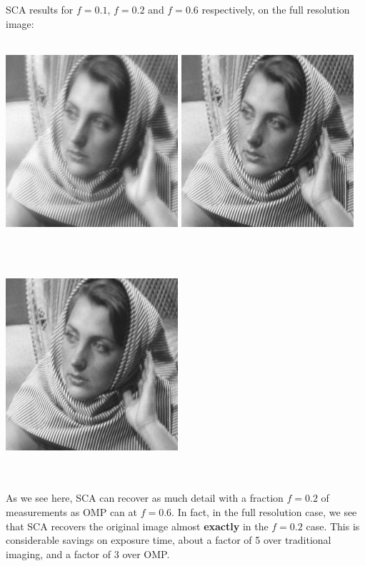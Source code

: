 \documentclass[letterpaper, 10 pt, conference]{article}
\begin{document}
\noindent SCA results for $f=0.1$, $f=0.2$ and $f=0.6$ respectively, on the full resolution image: \\ \\
\centerline{\includegraphics[scale=0.5]{out-sca4x-10p} \includegraphics[scale=0.5]{out-sca4x-20p}} \\ \\
\centerline{ \includegraphics[scale=0.5]{out-sca4x-60p}} \\ \\

\noindent As we see here, SCA can recover as much detail with a fraction $f=0.2$ of measurements as OMP can at $f=0.6$. In fact, in the full resolution case, we see that SCA recovers the original image almost \textbf{exactly} in the $f=0.2$ case. This is considerable savings on exposure time, about a factor of 5 over traditional imaging, and a factor of 3 over OMP.
\end{document}
